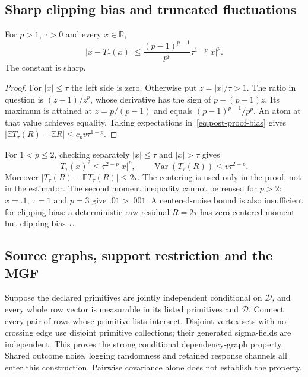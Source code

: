 \subsection{Sharp clipping bias and truncated fluctuations}

\begin{lemma}
\label{lem:post-bias}
For $p>1$, $\tau>0$ and every $x\in\mathbb R$,
\begin{equation}
 |x-T_\tau(x)|\leq
 \frac{(p-1)^{p-1}}{p^p}\tau^{1-p}|x|^p.
 \label{eq:post-proof-bias}
\end{equation}
The constant is sharp.
\end{lemma}
\begin{proof}
For $|x|\leq\tau$ the left side is zero. Otherwise put $z=|x|/\tau>1$.
The ratio in question is $(z-1)/z^p$, whose derivative has the sign of
$p-(p-1)z$. Its maximum is attained at $z=p/(p-1)$ and equals
$(p-1)^{p-1}/p^p$. An atom at that value achieves equality. Taking expectations
in~\eqref{eq:post-proof-bias} gives
$|\mathbb E T_\tau(R)-\mathbb E R|\leq c_pv\tau^{1-p}$.
\end{proof}

For $1<p\leq 2$, checking separately $|x|\leq\tau$ and $|x|>\tau$ gives
\begin{equation}
 T_\tau(x)^2\leq\tau^{2-p}|x|^p,
 \qquad
 \operatorname{Var}(T_\tau(R))\leq v\tau^{2-p}.
 \label{eq:post-proof-second}
\end{equation}
Moreover
$|T_\tau(R)-\mathbb E T_\tau(R)|\leq 2\tau$.
The centering is used only in the proof, not in the estimator. The second
moment inequality cannot be reused for $p>2$: $x=.1$, $\tau=1$ and $p=3$
give $.01>.001$. A centered-noise bound is also insufficient for clipping
bias: a deterministic raw residual $R=2\tau$ has zero centered moment but
clipping bias $\tau$.

\subsection{Source graphs, support restriction and the MGF}

Suppose the declared primitives are jointly independent conditional on
$\mathcal D$, and every whole row vector is measurable in its listed
primitives and $\mathcal D$. Connect every pair of rows whose primitive lists
intersect. Disjoint vertex sets with no crossing edge use disjoint primitive
collections; their generated sigma-fields are independent. This proves the
strong conditional dependency-graph property. Shared outcome noise, logging
randomness and retained response channels all enter this construction.
Pairwise covariance alone does not establish the property.


